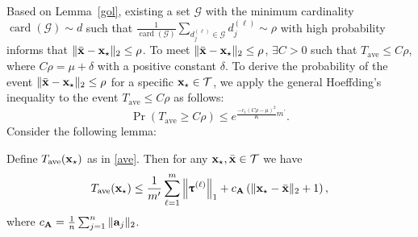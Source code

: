 \documentclass[12pt,draftcls,onecolumn]{IEEEtran}
\begin{document}
Based on Lemma~\ref{gol},
existing a set $\mathcal{G}$ with the minimum cardinality $\operatorname{card}(\mathcal{G})\sim d$ such that $\frac{1}{\operatorname{card}(\mathcal{G})}\sum_{d_j^{(\ell)}\in\mathcal{G}}d_j^{(\ell)}\sim\rho$ with high probability informs that $\|\bar{\mathbf{x}}-\mathbf{x}_{\star}\|_2\leq\rho$.
To meet $\|\bar{\mathbf{x}}-\mathbf{x}_{\star}\|_2\leq\rho$, 
$\exists C>0$ such that $T_{\mathrm{ave}}\leq C\rho$, where $C\rho=\mu+\delta$ with a positive constant $\delta$. To derive the probability of the event $\|\bar{\mathbf{x}}-\mathbf{x}_{\star}\|_2\leq\rho$ for a specific $\mathbf{x}_{\star}\in\mathcal{T}$, we apply the general Hoeffding's inequality \cite[Theorem~2.6.2]{vershynin2018high} to the event $T_{\mathrm{ave}}\leq C\rho$ as follows:
\begin{equation}
\label{sol_1}
\operatorname{Pr}\left(T_{\mathrm{ave}}\geq C \rho\right)\leq e^{\frac{-c_1\left(C\rho-\mu\right)^{2}}{K}m^{\prime}}.
\end{equation}
Consider the following lemma:
\begin{lemma}
\label{bound}
Define $T_{\mathrm{ave}}(\mathbf{x}_{\star})$ as in \eqref{ave}. Then for any $\mathbf{x}_{\star},\bar{\mathbf{x}}\in\mathcal{T}$ we have
\begin{equation}
\label{e1}
T_{\mathrm{ave}}(\mbx_{\star})\leq\frac{1}{m^{\prime}}\sum_{\ell=1}^{m}\left\|\boldsymbol{\uptau}^{(\ell)}\right\|_1+c_{\mbA}\left(\|\mbx_{\star}-\bar{\mbx}\|_2+1\right),
\end{equation}
where $c_{\mathbf{A}}=\frac{1}{n}\sum_{j=1}^{n}\|\mathbf{a}_j\|_2$.
\end{lemma}
\end{document}
